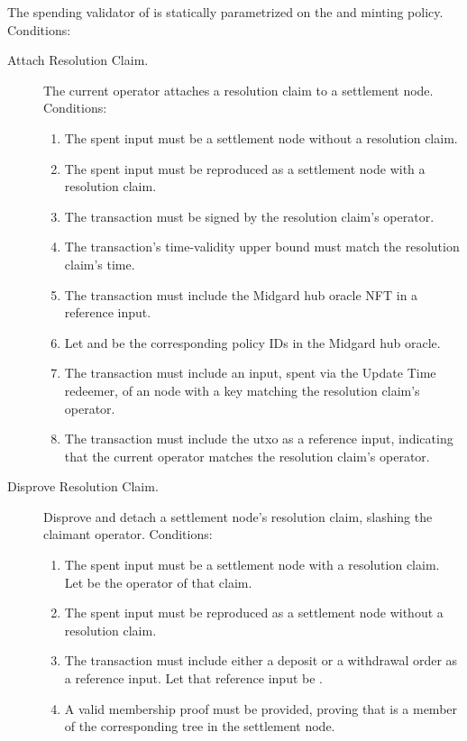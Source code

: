 \documentclass[../midgard.tex]{subfiles}
\begin{document}
The spending validator of  is statically parametrized on the  and  minting policy.
Conditions:
\begin{description}
  \item[Attach Resolution Claim.] The current operator attaches a resolution claim to a settlement node.
    Conditions:
      \begin{enumerate}
        \item The spent input must be a settlement node without a resolution claim.
        \item The spent input must be reproduced as a settlement node with a resolution claim.
        \item The transaction must be signed by the resolution claim's operator.
        \item The transaction's time-validity upper bound must match the resolution claim's time.
        \item The transaction must include the Midgard hub oracle NFT in a reference input.
        \item Let  and  be the corresponding policy IDs in the Midgard hub oracle.
        \item The transaction must include an input, spent via the Update Time redeemer, of an  node with a key matching the resolution claim's operator.
        \item The transaction must include the  utxo as a reference input, indicating that the current operator matches the resolution claim's operator.
      \end{enumerate}
  \item[Disprove Resolution Claim.] Disprove and detach a settlement node's resolution claim, slashing the claimant operator.
    Conditions:
      \begin{enumerate}
        \item The spent input must be a settlement node with a resolution claim.
          Let  be the operator of that claim.
        \item The spent input must be reproduced as a settlement node without a resolution claim.
        \item The transaction must include either a deposit or a withdrawal order as a reference input.
          Let that reference input be .
        \item A valid membership proof must be provided, proving that  is a member of the corresponding tree in the settlement node.

\end{enumerate}
\end{description}
\end{document}
